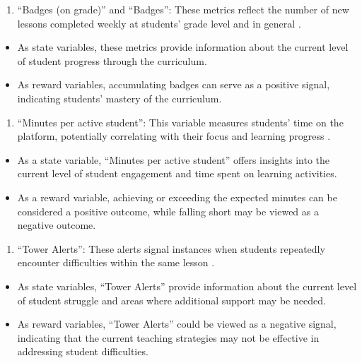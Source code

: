 \documentclass[
  number,
  preprint,
  3p,
  onecolumn]{elsarticle}
\providecommand{\tightlist}{%
  \setlength{\itemsep}{0pt}\setlength{\parskip}{0pt}}\usepackage{longtable,booktabs,array}
\begin{document}
\begin{enumerate}
\def\labelenumi{\arabic{enumi}.}
\setcounter{enumi}{2}
\tightlist
\item
  ``Badges (on grade)'' and ``Badges'': These metrics reflect the number
  of new lessons completed weekly at students' grade level and in
  general \citep{zearn2024a}.
\end{enumerate}

\begin{itemize}
\tightlist
\item
  As state variables, these metrics provide information about the
  current level of student progress through the curriculum.
\item
  As reward variables, accumulating badges can serve as a positive
  signal, indicating students' mastery of the curriculum.
\end{itemize}

\begin{enumerate}
\def\labelenumi{\arabic{enumi}.}
\setcounter{enumi}{3}
\tightlist
\item
  ``Minutes per active student'': This variable measures students' time
  on the platform, potentially correlating with their focus and learning
  progress \citep{zearn2022}.
\end{enumerate}

\begin{itemize}
\tightlist
\item
  As a state variable, ``Minutes per active student'' offers insights
  into the current level of student engagement and time spent on
  learning activities.
\item
  As a reward variable, achieving or exceeding the expected minutes can
  be considered a positive outcome, while falling short may be viewed as
  a negative outcome.
\end{itemize}

\begin{enumerate}
\def\labelenumi{\arabic{enumi}.}
\setcounter{enumi}{4}
\tightlist
\item
  ``Tower Alerts'': These alerts signal instances when students
  repeatedly encounter difficulties within the same lesson
  \citep{zearn2024b}.
\end{enumerate}

\begin{itemize}
\tightlist
\item
  As state variables, ``Tower Alerts'' provide information about the
  current level of student struggle and areas where additional support
  may be needed.
\item
  As reward variables, ``Tower Alerts'' could be viewed as a negative
  signal, indicating that the current teaching strategies may not be
  effective in addressing student difficulties.
\end{itemize}
\end{document}
